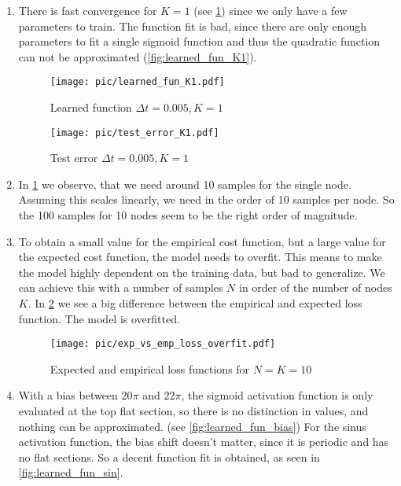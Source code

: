 \documentclass[a4paper,11pt]{scrartcl}
\newcommand*{\Dt}{\Delta{}t}
\begin{document}
\begin{enumerate}
\begin{enumerate}[leftmargin=1em]
  \item
    There is fast convergence for $K=1$ (see \cref{fig:test_error_K1}) since we
    only have a few parameters to train.
    The function fit is bad, since there are only enough parameters to fit a single
    sigmoid function and thus the quadratic function can not be approximated (\cref{fig:learned_fun_K1}).

    \begin{figure}[H]
        \begin{minipage}[t]{.5\linewidth}
          \centering
          \texttt{[image: pic/learned\_fun\_K1.pdf]}
          \caption{Learned function $\Dt=0.005, K=1$}
          \label{fig:learned_fun_K1}
        \end{minipage}%
        \begin{minipage}[t]{.5\linewidth}
          \centering
          \texttt{[image: pic/test\_error\_K1.pdf]}
          \caption{Test error $\Dt=0.005, K=1$}
          \label{fig:test_error_K1}
        \end{minipage}
    \end{figure}

   \item
     In \cref{fig:test_error_K1} we observe, that we need around 10 samples for
     the single node.
     Assuming this scales linearly, we need in the order of 10 samples per node.
     So the 100 samples for 10 nodes seem to be the right order of magnitude.

   \item
     To obtain a small value for the empirical cost function, but a large value
     for the expected cost function, the model needs to overfit.
     This means to make the model highly dependent on the training data, but bad
     to generalize.
     We can achieve this with a number of samples $N$ in order of the number of
     nodes $K$.
     In \cref{fig:exp_vs_emp_overfit} we see a big difference between the
     empirical and expected loss function.
     The model is overfitted.

    \begin{figure}[H]
        \centering
        \texttt{[image: pic/exp\_vs\_emp\_loss\_overfit.pdf]}
        \caption{Expected and empirical loss functions for $N=K=10$}
        \label{fig:exp_vs_emp_overfit}
    \end{figure}

   \item
     With a bias between $20\pi$ and $22\pi$, the sigmoid activation function is
     only evaluated at the top flat section, so there is no distinction in
     values, and nothing can be approximated. (see \cref{fig:learned_fun_bias})
     For the sinus activation function, the bias shift doesn't matter, since it is
     periodic and has no flat sections.
     So a decent function fit is obtained, as seen in \cref{fig:learned_fun_sin}.


\end{enumerate}
\end{enumerate}
\end{document}
